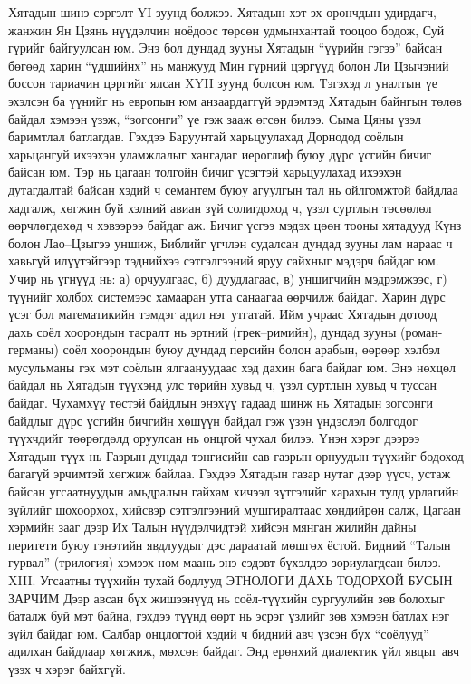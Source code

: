 Хятадын шинэ сэргэлт YI зуунд болжээ. Хятадын хэт эх орончдын удирдагч, жанжин Ян Цзянь нүүдэлчин ноёдоос төрсөн удмынхантай тооцоо бодож, Суй гүрийг байгуулсан юм. Энэ бол дундад зууны Хятадын “үүрийн гэгээ” байсан бөгөөд харин “үдшийнх” нь манжууд Мин гүрний цэргүүд болон Ли Цзычэний боссон тариачин цэргийг ялсан XYII зуунд болсон юм. Тэгэхэд л уналтын үе эхэлсэн ба үүнийг нь европын юм анзаардаггүй эрдэмтэд Хятадын байнгын төлөв байдал хэмээн үзэж, “зогсонги” үе гэж зааж өгсөн билээ. Сыма Цяны үзэл баримтлал батлагдав.
Гэхдээ Баруунтай харьцуулахад Дорнодод соёлын харьцангуй ихээхэн уламжлалыг хангадаг иероглиф буюу дүрс үсгийн бичиг байсан юм. Тэр нь цагаан толгойн бичиг үсэгтэй харьцуулахад ихээхэн дутагдалтай байсан хэдий ч семантем буюу агуулгын тал нь ойлгомжтой байдлаа хадгалж, хөгжин буй хэлний авиан зүй солигдоход ч, үзэл суртлын төсөөлөл өөрчлөгдөхөд ч хэвээрээ байдаг аж. Бичиг үсгээ мэдэх цөөн тооны хятадууд Күнз болон Лао–Цзыгээ уншиж, Библийг үгчлэн судалсан дундад зууны лам нараас ч хавьгүй илүүтэйгээр тэднийхээ сэтгэлгээний яруу сайхныг мэдэрч байдаг юм. Учир нь үгнүүд нь: а) орчуулгаас, б) дуудлагаас, в) уншигчийн мэдрэмжээс, г) түүнийг холбох системээс хамааран утга санаагаа өөрчилж байдаг. Харин дүрс үсэг бол математикийн тэмдэг адил нэг утгатай. Ийм учраас Хятадын дотоод дахь соёл хоорондын тасралт нь эртний (грек–римийн), дундад зууны (роман-германы) соёл хоорондын буюу дундад персийн болон арабын, өөрөөр хэлбэл мусульманы гэх мэт соёлын ялгаануудаас хэд дахин бага байдаг юм.
Энэ нөхцөл байдал нь Хятадын түүхэнд улс төрийн хувьд ч, үзэл суртлын хувьд ч туссан байдаг. Чухамхүү төстэй байдлын энэхүү гадаад шинж нь Хятадын зогсонги байдлыг дүрс үсгийн бичгийн хөшүүн байдал гэж үзэн үндэслэл болгодог түүхчдийг төөрөгдөлд оруулсан нь онцгой чухал билээ. Үнэн хэрэг дээрээ Хятадын түүх нь Газрын дундад тэнгисийн сав газрын орнуудын түүхийг бодоход багагүй эрчимтэй хөгжиж байлаа. Гэхдээ Хятадын газар нутаг дээр үүсч, устаж байсан угсаатнуудын амьдралын гайхам хичээл зүтгэлийг харахын тулд урлагийн зүйлийг шохоорхох, хийсвэр сэтгэлгээний мушгиралтаас хөндийрөн салж, Цагаан хэрмийн зааг дээр Их Талын нүүдэлчидтэй хийсэн мянган жилийн дайны перитети буюу гэнэтийн явдлуудыг дэс дараатай мөшгөх ёстой. Бидний “Талын гурвал” (трилогия) хэмээх ном маань энэ сэдэвт бүхэлдээ зориулагдсан билээ.
XIII. Угсаатны түүхийн тухай бодлууд
ЭТНОЛОГИ ДАХЬ ТОДОРХОЙ БУСЫН ЗАРЧИМ
Дээр авсан бүх жишээнүүд нь соёл-түүхийн сургуулийн зөв болохыг баталж буй мэт байна, гэхдээ түүнд өөрт нь эсрэг үзлийг зөв хэмээн батлах нэг зүйл байдаг юм. Салбар онцлогтой хэдий ч бидний авч үзсэн бүх “соёлууд” адилхан байдлаар хөгжиж, мөхсөн байдаг. Энд ерөнхий диалектик үйл явцыг авч үзэх ч хэрэг байхгүй.
